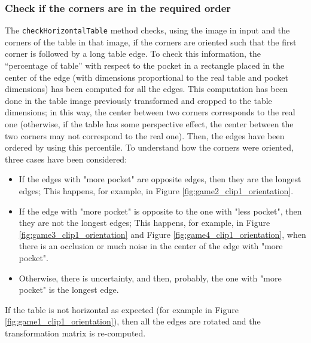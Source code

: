 \subsubsection{Check if the corners are in the required order}
The \texttt{checkHorizontalTable} method checks, using the image in input and the corners of the table in that image, if the corners are oriented such that the first corner is followed by a long table edge.
To check this information, the “percentage of table” with respect to the pocket in a rectangle placed in the center of the edge (with dimensions proportional to the real table and pocket dimensions) has been computed for all the edges. This computation has been done in the table image previously transformed and cropped to the table dimensions; in this way, the center between two corners corresponds to the real one (otherwise, if the table has some perspective effect, the center between the two corners may not correspond to the real one). Then, the edges have been ordered by using this percentile. To understand how the corners were oriented, three cases have been considered:
\begin{itemize}
	\item If the edges with "more pocket" are opposite edges, then they are the longest edges; This happens, for example, in Figure \ref{fig:game2_clip1_orientation}.
	\item If the edge with "more pocket" is opposite to the one with "less pocket", then they are not the longest edges; This happens, for example, in Figure \ref{fig:game3_clip1_orientation} and Figure \ref{fig:game4_clip1_orientation}, when there is an occlusion or much noise in the center of the edge with "more pocket".
	\item Otherwise, there is uncertainty, and then, probably, the one with "more pocket" is the longest edge.
\end{itemize}
If the table is not horizontal as expected (for example in Figure \ref{fig:game1_clip1_orientation}), then all the edges are rotated and the transformation matrix is re-computed.


